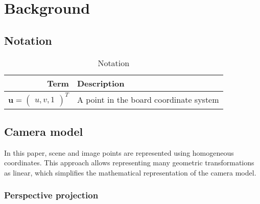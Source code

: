 \chapter{Background}\label{cha:background}

\section{Notation}\label{sec:notation}

\begin{table}[htbp]
	\label{tab:notation}
	\centering
	\begin{tabular}{rl}
		\toprule
		Term                           & Description                                \\
		\midrule
		\(\mathbf{u} = \begin{pmatrix}
			               u, v, 1
		               \end{pmatrix}^{T}\) & A point in the board coordinate system \\

		\bottomrule
	\end{tabular}
	\caption{Notation}
\end{table}

\section{Camera model}\label{sec:camera_model}

In this paper, scene and image points are represented using homogeneous
coordinates. This approach allows representing many geometric transformations as
linear, which simplifies the mathematical representation of the camera model.

\subsection{Perspective projection}\label{sub:perspective_projection}

